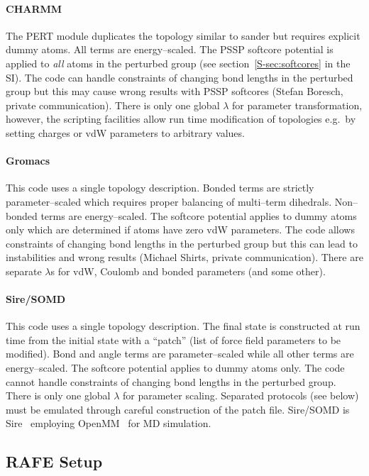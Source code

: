 \documentclass[journal=jctcce,manuscript=article]{achemso}
\begin{document}
\paragraph{CHARMM} The PERT module duplicates the topology similar to
sander but requires explicit dummy atoms.  All terms are
energy--scaled.  The PSSP softcore potential is applied to \emph{all}
atoms in the perturbed group (see section~\ref{S-sec:softcores} in the SI).  The code can handle
constraints of changing bond lengths in the perturbed group but this
may cause wrong results with PSSP softcores (Stefan Boresch, private
communication).  There is only one global $\lambda$ for parameter
transformation, however, the scripting facilities allow run time
modification of topologies e.g.\ by setting charges or vdW parameters
to arbitrary values.

\paragraph{Gromacs} This code uses a single topology description.
Bonded terms are strictly parameter--scaled which requires proper
balancing of multi--term dihedrals.  Non--bonded terms are
energy--scaled.  The softcore potential applies to dummy atoms only
which are determined if atoms have zero vdW parameters.  The code
allows constraints of changing bond lengths in the perturbed group but
this can lead to instabilities and wrong results (Michael Shirts,
private communication).  There are separate $\lambda$s for vdW,
Coulomb and bonded parameters (and some other).

\paragraph{Sire/SOMD} This code uses a single topology description.
The final state is constructed at run time from the initial state with
a ``patch'' (list of force field parameters to be modified).  Bond and
angle terms are parameter--scaled while all other terms are
energy--scaled.  The softcore potential applies to dummy atoms only.
The code cannot handle constraints of changing bond lengths in the
perturbed group.  There is only one global $\lambda$ for parameter
scaling.  Separated protocols (see below) must be emulated through
careful construction of the patch file.  Sire/SOMD is
Sire~\cite{Sire-2016} employing OpenMM~\cite{doi:10.1021/ct300857j}
for MD simulation.

\subsection{RAFE Setup}
\label{sec:rafe_setup}
\end{document}
